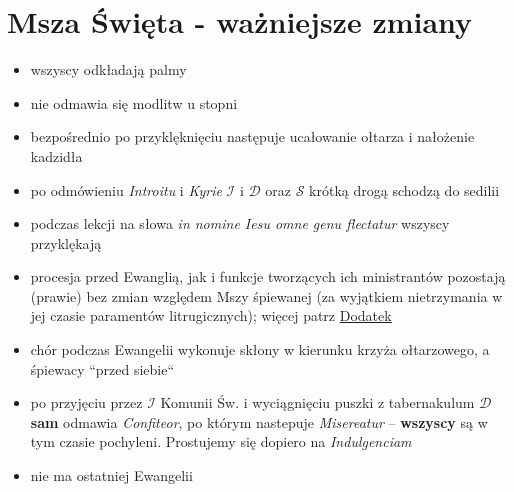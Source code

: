 	\section{Msza Święta - ważniejsze zmiany}
		\begin{itemize}
		 \item wszyscy odkładają palmy
		 \item nie odmawia się modlitw u stopni
		 \item bezpośrednio po przyklęknięciu następuje ucałowanie ołtarza i nałożenie kadzidła
		 \item po odmówieniu \textit{Introitu} i \textit{Kyrie} $\mathcal{I}$ i $\mathcal{D}$ oraz $\mathcal{S}$ krótką drogą schodzą do sedilii
		 \item podczas lekcji na słowa \textit{in nomine Iesu omne genu flectatur} wszyscy przyklękają
		 \item procesja przed Ewanglią, jak i funkcje tworzących ich ministrantów pozostają (prawie) bez zmian względem Mszy śpiewanej (za wyjątkiem nietrzymania w jej czasie paramentów litrugicznych); więcej patrz \hyperref[E]{Dodatek}
		 \item chór podczas Ewangelii wykonuje skłony w kierunku krzyża ołtarzowego, a śpiewacy ``przed siebie``
		 \item po przyjęciu przez $\mathcal{I}$ Komunii Św. i wyciągnięciu puszki z tabernakulum $\mathcal{D}$ \textbf{sam} odmawia \textit{Confiteor}, po którym nastepuje \textit{Misereatur} -- \textbf{wszyscy} są w tym czasie pochyleni. Prostujemy się dopiero na \textit{Indulgenciam}
		 \item nie ma ostatniej Ewangelii
		
		\end{itemize}